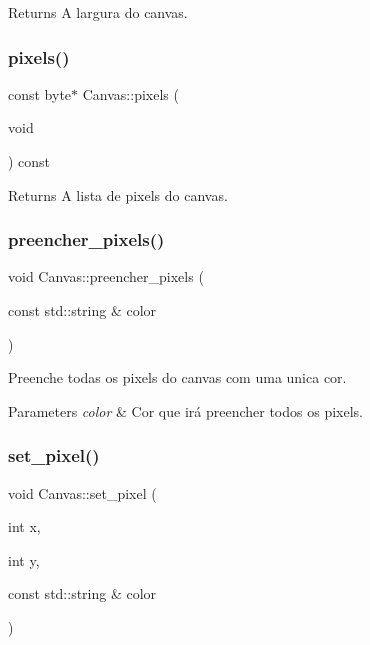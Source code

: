 \begin{DoxyReturn}{Returns}
A largura do canvas. 
\end{DoxyReturn}
\mbox{\label{class_canvas_ae12797921c597c32270bfa6e51930031}} 
\subsubsection{pixels()}
{\footnotesize\ttfamily const byte$\ast$ Canvas\+::pixels (\begin{DoxyParamCaption}\item[{void}]{ }\end{DoxyParamCaption}) const\hspace{0.3cm}{\ttfamily [inline]}}

\begin{DoxyReturn}{Returns}
A lista de pixels do canvas. 
\end{DoxyReturn}
\mbox{\label{class_canvas_a6c806351e8eac47b0b3da8fec7085094}} 
\subsubsection{preencher\+\_\+pixels()}
{\footnotesize\ttfamily void Canvas\+::preencher\+\_\+pixels (\begin{DoxyParamCaption}\item[{const std\+::string \&}]{color }\end{DoxyParamCaption})\hspace{0.3cm}{\ttfamily [inline]}}

Preenche todas os pixels do canvas com uma unica cor. 
\begin{DoxyParams}{Parameters}
{\em color} & Cor que irá preencher todos os pixels. \\
\hline
\end{DoxyParams}
\mbox{\label{class_canvas_a90dfde39fc22f8e0bd2cea7ce5b7b40f}} 
\subsubsection{set\+\_\+pixel()}
{\footnotesize\ttfamily void Canvas\+::set\+\_\+pixel (\begin{DoxyParamCaption}\item[{int}]{x,  }\item[{int}]{y,  }\item[{const std\+::string \&}]{color }\end{DoxyParamCaption})\hspace{0.3cm}{\ttfamily [inline]}}

